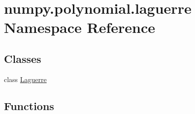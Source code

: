 \hypertarget{namespacenumpy_1_1polynomial_1_1laguerre}{}\section{numpy.\+polynomial.\+laguerre Namespace Reference}
\label{namespacenumpy_1_1polynomial_1_1laguerre}
\subsection*{Classes}
\begin{DoxyCompactItemize}
\item 
class \hyperlink{classnumpy_1_1polynomial_1_1laguerre_1_1Laguerre}{Laguerre}
\end{DoxyCompactItemize}
\subsection*{Functions}
